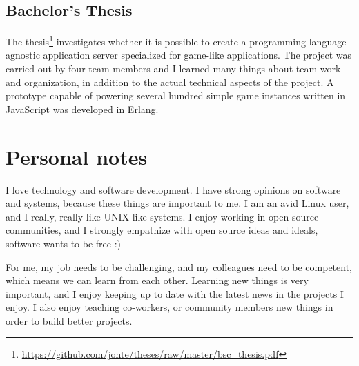\documentclass{twocolcv}
\begin{document}
\subsection*{Bachelor's Thesis}
The thesis\footnote{\url{https://github.com/jonte/theses/raw/master/bsc_thesis.pdf}} investigates whether it is possible to create a programming language agnostic application server specialized for game-like applications. The project was carried out by four team members and I learned many things about team work and organization, in addition to the actual technical aspects of the project. A prototype capable of powering several hundred simple game instances written in JavaScript was developed in Erlang.

\section*{Personal notes}
I love technology and software development. I have strong opinions on software and systems, because these things are important to me. I am an avid Linux user, and I really, really like UNIX-like systems. I enjoy working in open source communities, and I strongly empathize with open source ideas and ideals, software wants to be free :)

For me, my job needs to be challenging, and my colleagues need to be competent, which means we can learn from each other. Learning new things is very important, and I enjoy keeping up to date with the latest news in the projects I enjoy. I also enjoy teaching co-workers, or community members new things in order to build better projects.
\end{document}
